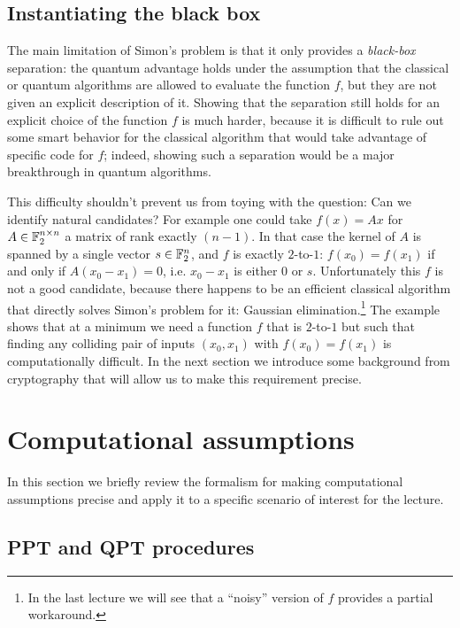 \subsection{Instantiating the black box}
\label{sec:simon-instantiate}

The main limitation of Simon's problem is that it only provides a \emph{black-box} separation: the quantum advantage holds under the assumption that the classical or quantum algorithms are allowed to evaluate the function $f$, but they are not given an explicit description of it. Showing that the separation still holds for an explicit choice of the function $f$ is much harder, because it is difficult to rule out some smart behavior for the classical algorithm that would take advantage of specific code for $f$; indeed, showing such a separation would be a major breakthrough in quantum algorithms. 

This difficulty shouldn't prevent us from toying with the question: Can we identify natural candidates? For example one could take $f(x) = Ax$ for $A\in \mathbb{F}_2^{n\times n}$ a matrix of rank exactly $(n-1)$. In that case the kernel of $A$ is spanned by a single vector $s\in\mathbb{F}_2^n$, and $f$ is exactly $2$-to-$1$: $f(x_0)=f(x_1)$ if and only if $A(x_0-x_1)=0$, i.e. $x_0-x_1$ is either $0$ or $s$. 
Unfortunately this $f$ is not a good candidate, because there happens to be an efficient classical algorithm that directly solves Simon's problem for it: Gaussian elimination.\footnote{In the last lecture we will see that a ``noisy'' version of $f$ provides a partial workaround.} The example shows that at a minimum we need a function $f$ that is $2$-to-$1$ but such that finding any colliding pair of inputs $(x_0,x_1)$ with $f(x_0)=f(x_1)$ is computationally difficult. In the next section we introduce some background from cryptography that will allow us to make this requirement precise. 

\section{Computational assumptions}

In this section we briefly review the formalism for making computational assumptions precise and apply it to a specific scenario  of interest for the lecture. 

\subsection{PPT and QPT procedures}

